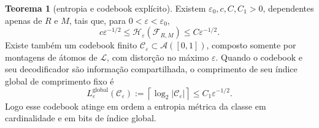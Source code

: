 \documentclass[12pt,a4paper]{article}
\theoremstyle{preciso}
\theoremstyle{definition}
\newcommand{\Aclass}{\mathcal{A}}
\newcommand{\Library}{\mathcal{L}}
\theoremstyle{preciso}
\newtheorem{theorem}[teorema]{Teorema}
\theoremstyle{preciso}
\theoremstyle{preciso}
\theoremstyle{preciso}
\theoremstyle{definition}
\theoremstyle{preciso}
\theoremstyle{definition}
\theoremstyle{preciso}
\theoremstyle{preciso}
\theoremstyle{definition}
\begin{document}
\begin{theorem}[entropia e codebook explícito]\label{map:artigo_2:3.18}\label{artigo_2:thm:entropy}
Existem $\varepsilon_0,c,C,C_1>0$, dependentes apenas de $R$ e $M$, tais que, para $0<\varepsilon<\varepsilon_0$,
\begin{equation}
 c\varepsilon^{-1/2}
 \le\mathcal{H}_\varepsilon(\mathcal{F}_{R,M})
 \le C\varepsilon^{-1/2}.
 \label{artigo_2:eq:entropy-order}
\end{equation}
Existe também um codebook finito $\mathcal{C}_\varepsilon\subset\Aclass([0,1])$, composto somente por montagens de átomos de $\Library$, com distorção no máximo $\varepsilon$. Quando o codebook e seu decodificador são informação compartilhada, o comprimento de seu índice global de comprimento fixo é
\begin{equation}
 L_\varepsilon^{\mathrm{global}}(\mathcal C_\varepsilon)
 :=\left\lceil\log_2|\mathcal{C}_\varepsilon|\right\rceil
 \le C_1\varepsilon^{-1/2}.
 \label{artigo_2:eq:code-length}
\end{equation}
Logo esse codebook atinge em ordem a entropia métrica da classe em cardinalidade e em bits de índice global.
\end{theorem}
\end{document}
